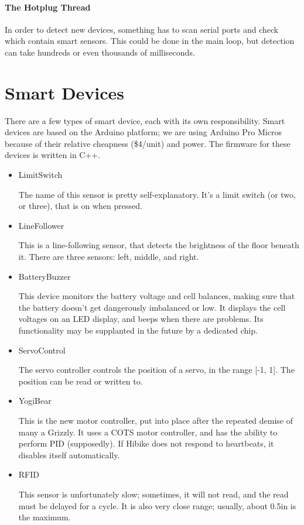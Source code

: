 \documentclass[12pt]{book}
\begin{document}
\paragraph{The Hotplug Thread}
In order to detect new devices, something has to scan serial ports
and check which contain smart sensors. This could be done in the
main loop, but detection can take hundreds or even thousands of
milliseconds.

\section{Smart Devices}
There are a few types of smart device, each with its own responsibility.
Smart devices are based on the Arduino platform; we are using
Arduino Pro Micros because of their relative cheapness (\$4/unit)
and power. The firmware for these devices is written in C++.

\begin{itemize}
    \item LimitSwitch
        
        The name of this sensor is pretty self-explanatory. It's a limit
        switch (or two, or three), that is on when pressed.
    \item LineFollower

        This is a line-following sensor, that detects the brightness of
        the floor beneath it. There are three sensors: left, middle,
        and right.
    \item BatteryBuzzer

        This device monitors the battery voltage and cell balances,
        making sure that the battery doesn't get dangerously
        imbalanced or low. It displays the cell voltages
        on an LED display, and beeps when there are problems.
        Its functionality may be supplanted in
        the future by a dedicated chip.
    \item ServoControl

        The servo controller controls the position of a servo,
        in the range [-1, 1]. The position can be read or written to.

    \item YogiBear

        This is the new motor controller, put into place after the
        repeated demise of many a Grizzly. It uses a COTS motor controller,
        and has the ability to perform PID (supposedly). If Hibike
        does not respond to heartbeats, it disables itself automatically.

    \item RFID

        This sensor is unfortunately slow; sometimes, it will not read,
        and the read must be delayed for a cycle. It is also very close
        range; usually, about 0.5in is the maximum.
\end{itemize}
\end{document}
